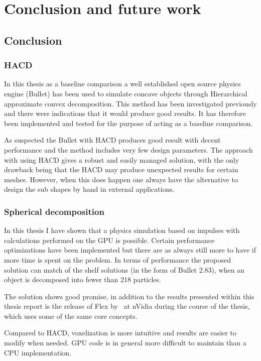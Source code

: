 \chapter{Conclusion and future work}
\section{Conclusion}
\subsection{HACD}
In this thesis as a baseline comparison a well established open source physics engine
(Bullet) has been used to simulate concave objects through Hierarchical approximate
 convex decomposition. This method has been investigated previously and there were
 indications that it would produce good results. It has therefore been implemented
 and tested for the purpose of acting as a baseline comparison.

As suspected the Bullet with HACD produces good result with decent performance and
the method includes very few design parameters. The approach with using HACD gives
a robust and easily managed solution, with the only drawback being that the HACD
may produce unexpected results for certain meshes. However, when this does happen
one always have the alternative to design the sub shapes by hand in external applications.

\subsection{Spherical decomposition}
In this thesis I have shown that a physics simulation based on impulses with
calculations performed on the GPU is possible. Certain performance optimizations
have been implemented but there are as always still more to have if more time is
spent on the problem. In terms of performance the proposed solution can match of the shelf
solutions (in the form of Bullet 2.83), when an object is decomposed into fewer than
218 particles.

The solution shows good promise, in addition to the results presented within this
thesis report is the release of Flex by~\cite{flex} at nVidia
during the course of the thesis, which uses some of the same core concepts.

Compared to HACD, voxelization is more intuitive and results are easier to modify
when needed. GPU code is in general more difficult to maintain than a CPU implementation.

